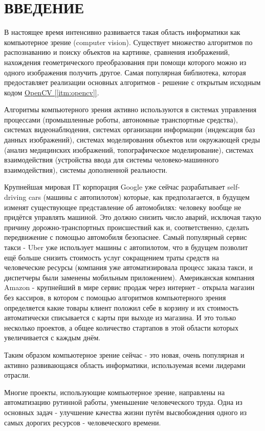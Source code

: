 \chapter*{ВВЕДЕНИЕ}

В настоящее время интенсивно развивается такая область информатики как компьютерное зрение (computer vision). Существует множество алгоритмов по распознаванию и поиску объектов на картинке, сравнения изображений, нахождения геометрического преобразования при помощи которого можно из одного изображения получить другое. Самая популярная библиотека, которая предоставляет реализации основных алгоритмов - решение с открытым исходным кодом \hyperref[itm:opencv]{OpenCV [\ref{itm:opencv}]}.

Алгоритмы компьютерного зрения активно используются в системах управления процессами (промышленные роботы, автономные транспортные средства), системах видеонаблюдения, системах организации информации (индексация баз данных изображений), системах моделирования объектов или окружающей среды (анализ медицинских изображений, топографическое моделирование), системах взаимодействия (устройства ввода для системы человеко-машинного взаимодействия), системы дополненной реальности.

Крупнейшая мировая IT корпорация Google уже сейчас разрабатывает self-driving cars (машины с автопилотом) которые, как предполагается, в будущем изменят существующее представление об автомобилях: человеку вообще не придётся управлять машиной. Это должно снизить число аварий, исключая такую причину дорожно-транспортных происшествий как  и, соответственно, сделать передвижение с помощью автомобиля безопаснее. Самый популярный сервис такси - Uber уже использует машины с автопилотом, что в будущем позволит ещё больше снизить стоимость услуг сокращением траты средств на человеческие ресурсы (компания уже автоматизировала процесс заказа такси, и диспетчеры были заменены мобильным приложением). Американская компания Amazon - крупнейший в мире сервис продаж через интернет - открыла магазин без кассиров, в котором с помощью алгоритмов компьютерного зрения определяется какие товары клиент положил себе в корзину и их стоимость автоматически списывается с карты при выходе из магазина. И это только несколько проектов, а общее количество стартапов в этой области которых увеличивается с каждым днём.

Таким образом компьютерное зрение сейчас - это новая, очень популярная и активно развивающаяся область информатики, используемая всеми лидерами отрасли.

Многие проекты, использующие компьютерное зрение, направлены на автоматизацию рутинной работы, уменьшение человеческого труда. Одна из основных задач - улучшение качества жизни путём высвобождения одного из самых дорогих ресурсов - человеческого времени.
